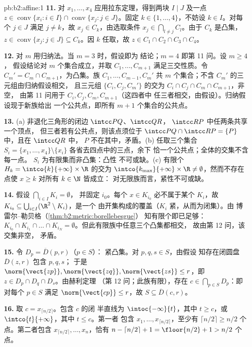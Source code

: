 \begin{solution}{pb:b2:affine:1}
\textbf{11.} 对 $x_1, \dots, x_4$ 应用拉东定理，得到两块
$I \mid J$ 及一点 $z \in \operatorname{conv}\{x_i : i
\in I\} \cap \operatorname{conv}\{x_j : j \in J\}$。固定 $k
\in \{1, \dots, 4\}$，不妨设 $k \in I$。对每个 $j \in J$
满足 $j \neq k$，故 $x_j \in C_k$，由选取条件 $x_j \in
\bigcap_{l \neq j}C_l$。由于 $C_k$ 是凸集，$z \in
\operatorname{conv}\{x_j : j \in J\} \subseteq C_k$。因 $k$
任取，故 $z \in C_1 \cap C_2 \cap C_3 \cap C_4$。

\textbf{12.} 对 $m$ 用归纳法。当 $m = 3$ 时，假设即为
结论；$m = 4$ 即第 11 问。设 $m \geq 4$，
假设结论对 $m$ 个集合成立，并取 $C_1, \dots,
C_{m+1}$ 满足三交性质。令 $C_m' =
C_m \cap C_{m+1}$，为凸集。族 $C_1, \dots, C_{m-1},
C_m'$ 共 $m$ 个集合；不含 $C_m'$ 的三元组由归纳假设相交，
且三元组 $\{C_i, C_j, C_m'\}$ 的交为
$C_i \cap C_j \cap C_m \cap C_{m+1}$，非空，
由第 11 问用于 $C_i, C_j, C_m, C_{m+1}$（这四者中
任三者相交，由假设）。归纳假设现于新族给出
一个公共点，即所有 $m+1$
个集合的公共点。

\textbf{13.} (a) 非退化三角形的闭边 $\intcc PQ$、$\intcc QR$，
$\intcc RP$ 中任两条共享一个顶点，
但三者若有公共点，则该点须位于 $\intcc
PQ \cap \intcc RP = \{P\}$ 中，且在 $\intcc QR$ 中，
$P$ 不在其中，矛盾。(b) 任取三个集合 $S_i = \{x_1, \dots, x_4\}
\setminus \{x_i\}$ 各省去四点中的三点，余下
恰一个公共点；全体的交集不含每一点。
$S_i$ 为有限集而非凸集：凸性
不可或缺。(c) 有限个 $H_k = \intco{k}{+\infty} \times
\R$ 的交为 $\intco{k_{\max}}{+\infty} \times \R \neq
\emptyset$，然而不存在点使 $x \geq k$ 对所有 $k \in \N$ 皆成立：
对无限族而言，紧性不可或缺。

\textbf{14.} 假设 $\bigcap_{i \in I}K_i = \emptyset$，
并固定 $i_0$。每个 $x \in K_{i_0}$ 必不属于某个 $K_i$，故
$K_{i_0} \subseteq \bigcup_{i \in I}(\R^2 \setminus K_i)$，是一个
由开集构成的覆盖（$K_i$ 紧，从而为闭集）。由
博雷尔--勒贝格（\cref{thm:b2:metric:borellebesgue}）
知有限个即已足够：$K_{i_0} \cap K_{i_1} \cap \dots \cap K_{i_N} =
\emptyset$。但此有限族中任意三个凸集都相交，
故由第 12 问，该交集非空，
矛盾。

\textbf{15.} 令 $D_p = \overline D(p, r)$（$p \in S$）：
紧凸集。对 $p, q, s \in S$，由假设
知存在闭圆盘 $\overline D(z, r)$ 包含 $p, q, s$；
于是 $\norm{\vect{zp}}, \norm{\vect{zq}}, \norm{\vect{zs}}
\leq r$，即 $z \in D_p \cap D_q \cap D_s$。由赫利定理
（第 12 问；此族有限），存在 $c \in
\bigcap_{p \in S}D_p$：即对每个 $p \in S$ 满足
$\norm{\vect{cp}} \leq r$，故 $S \subseteq \overline D(c,
r)$。

\textbf{16.} 取 $c = x_{\lceil n/2\rceil}$。包含 $c$ 的闭
半直线为 $\intoc{-\infty}{t}$，其中 $t \geq
c$，或 $\intco{t}{+\infty}$，其中 $t \leq c$。第一者
包含 $x_1, \dots, x_{\lceil n/2\rceil}$，至少有
$\lceil n/2\rceil \geq n/2$ 个点。第二者包含
$x_{\lceil n/2\rceil}, \dots, x_n$，恰有 $n - \lceil
n/2\rceil + 1 = \floor{n/2} + 1 > n/2$ 个点。


\end{solution}
